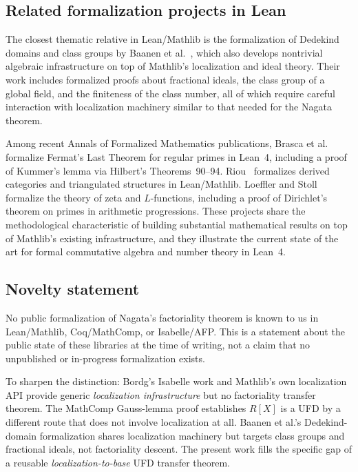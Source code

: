 \documentclass[11pt]{article}
\theoremstyle{plain}
\theoremstyle{definition}
\theoremstyle{remark}
\begin{document}
\subsection{Related formalization projects in Lean}

The closest thematic relative in Lean/Mathlib is the formalization of Dedekind
domains and class groups by Baanen et al.~\cite{baanen-dedekind}, which
also develops nontrivial algebraic infrastructure on top of Mathlib's
localization and ideal theory.  Their work includes formalized proofs about
fractional ideals, the class group of a global field, and the finiteness of
the class number, all of which require careful interaction with localization
machinery similar to that needed for the Nagata theorem.

Among recent Annals of Formalized Mathematics publications, Brasca
et al.~\cite{brasca-flt} formalize Fermat's Last Theorem for regular primes
in Lean~4, including a proof of Kummer's lemma via Hilbert's Theorems~90--94.
Riou~\cite{riou-derived} formalizes derived categories and triangulated
structures in Lean/Mathlib.  Loeffler and Stoll~\cite{loeffler-zeta}
formalize the theory of zeta and $L$-functions, including a proof of
Dirichlet's theorem on primes in arithmetic progressions.  These projects
share the methodological characteristic of building substantial mathematical
results on top of Mathlib's existing infrastructure, and they illustrate the
current state of the art for formal commutative algebra and number theory in
Lean~4.

\subsection{Novelty statement}

No public formalization of Nagata's factoriality theorem is known to us in
Lean/Mathlib, Coq/MathComp, or Isabelle/AFP.  This is a statement about the
public state of these libraries at the time of writing, not a claim that no
unpublished or in-progress formalization exists.

To sharpen the distinction: Bordg's Isabelle work and Mathlib's own
localization API provide generic \emph{localization infrastructure} but no
factoriality transfer theorem.  The MathComp Gauss-lemma proof establishes
$R[X]$ is a UFD by a different route that does not involve localization at all.
Baanen et al.'s Dedekind-domain formalization shares localization machinery but
targets class groups and fractional ideals, not factoriality descent.  The
present work fills the specific gap of a reusable \emph{localization-to-base}
UFD transfer theorem.
\end{document}
